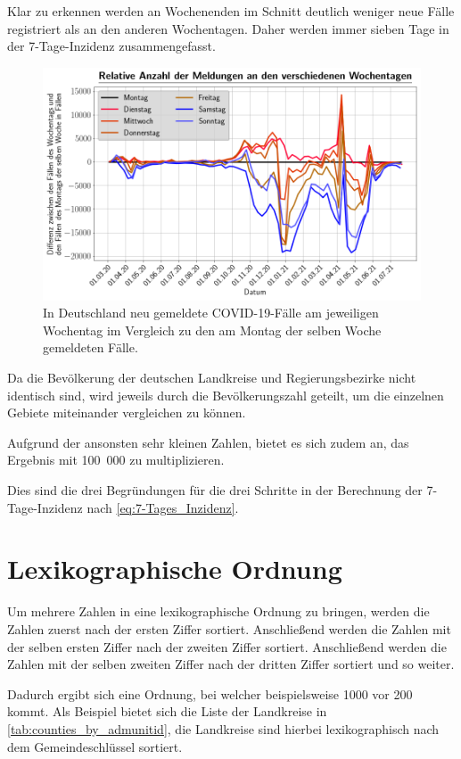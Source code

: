 Klar zu erkennen werden an Wochenenden im Schnitt deutlich weniger neue Fälle registriert als an den anderen Wochentagen.
Daher werden immer sieben Tage in der 7-Tage-Inzidenz zusammengefasst.
\begin{figure}[H]
    \centering
    \includegraphics[width=\textwidth]{figures/Grundlagen/neue_Fälle_pro_Wochentag_Deutschland.png}
    \caption{In Deutschland neu gemeldete COVID-19-Fälle am jeweiligen Wochentag im Vergleich zu den am Montag der selben Woche gemeldeten Fälle.}
    \label{fig:neue_Fälle_pro_Wochentag_Deutschland}
\end{figure}
Da die Bevölkerung der deutschen Landkreise und Regierungsbezirke nicht identisch sind, wird jeweils durch die Bevölkerungszahl geteilt, um die einzelnen Gebiete miteinander vergleichen zu können.

\newpage
Aufgrund der ansonsten sehr kleinen Zahlen, bietet es sich zudem an, das Ergebnis mit 100~000 zu multiplizieren.

Dies sind die drei Begründungen für die drei Schritte in der Berechnung der 7-Tage-Inzidenz nach \autoref{eq:7-Tages_Inzidenz}.

\section{Lexikographische Ordnung}\label{sec:Grundlagen:lexikographisch}
Um mehrere Zahlen in eine lexikographische Ordnung zu bringen, werden die Zahlen zuerst nach der ersten Ziffer sortiert. Anschließend werden die Zahlen mit der selben ersten Ziffer nach der zweiten Ziffer sortiert. Anschließend werden die Zahlen mit der selben zweiten Ziffer nach der dritten Ziffer sortiert und so weiter.

Dadurch ergibt sich eine Ordnung, bei welcher beispielsweise 1000 vor 200 kommt. Als Beispiel bietet sich die Liste der Landkreise in \autoref{tab:counties_by_admunitid}, die Landkreise sind hierbei lexikographisch nach dem Gemeindeschlüssel sortiert.
